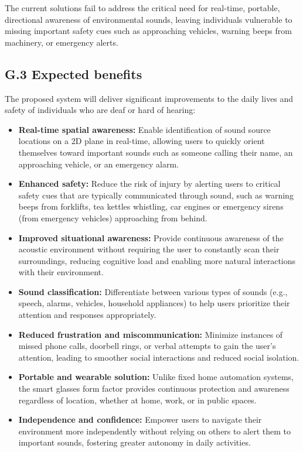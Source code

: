 \documentclass[12pt]{article}
\theoremstyle{definition}
\begin{document}
The current solutions fail to address the critical need for real-time, portable,
directional awareness of environmental sounds, leaving individuals vulnerable to
missing important safety cues such as approaching vehicles, warning beeps from
machinery, or emergency alerts.

\subsection{G.3 Expected benefits}

The proposed system will deliver significant improvements to the daily lives and
safety of individuals who are deaf or hard of hearing:

\begin{itemize}
\item \textbf{Real-time spatial awareness:} Enable identification of sound
source locations on a 2D plane in real-time, allowing users to quickly orient
themselves toward important sounds such as someone calling their name, an
approaching vehicle, or an emergency alarm.

\item \textbf{Enhanced safety:} Reduce the risk of injury by alerting users to
critical safety cues that are typically communicated through sound, such as
warning beeps from forklifts, tea kettles whistling, car engines or emergency
sirens (from emergency vehicles) approaching from behind.

\item \textbf{Improved situational awareness:} Provide continuous awareness of
the acoustic environment without requiring the user to constantly scan their
surroundings, reducing cognitive load and enabling more natural interactions
with their environment.

\item \textbf{Sound classification:} Differentiate between various types of
sounds (e.g., speech, alarms, vehicles, household appliances) to help users
prioritize their attention and responses appropriately.

\item \textbf{Reduced frustration and miscommunication:} Minimize instances of
missed phone calls, doorbell rings, or verbal attempts to gain the user's
attention, leading to smoother social interactions and reduced social isolation.

\item \textbf{Portable and wearable solution:} Unlike fixed home automation
systems, the smart glasses form factor provides continuous protection and
awareness regardless of location, whether at home, work, or in public spaces.

\item \textbf{Independence and confidence:} Empower users to navigate their
environment more independently without relying on others to alert them to
important sounds, fostering greater autonomy in daily activities.
\end{itemize}
\end{document}

